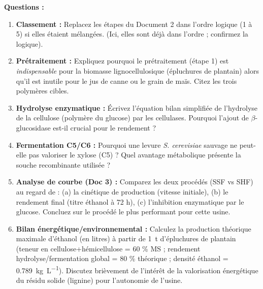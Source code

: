 \documentclass[11pt]{article}
\begin{document}
\begin{exercice}
\textbf{Questions :}
\begin{enumerate}
    \item \textbf{Classement :} Replacez les étapes du Document 2 dans l'ordre logique (1 à 5) si elles étaient mélangées. (Ici, elles sont déjà dans l'ordre ; confirmez la logique).
    \item \textbf{Prétraitement :} Expliquez pourquoi le prétraitement (étape 1) est \emph{indispensable} pour la biomasse lignocellulosique (épluchures de plantain) alors qu'il est inutile pour le jus de canne ou le grain de maïs. Citez les trois polymères cibles.
    \item \textbf{Hydrolyse enzymatique :} Écrivez l'équation bilan simplifiée de l'hydrolyse de la cellulose (polymère du glucose) par les cellulases. Pourquoi l'ajout de $\beta$-glucosidase est-il crucial pour le rendement ?
    \item \textbf{Fermentation C5/C6 :} Pourquoi une levure \emph{S. cerevisiae} sauvage ne peut-elle pas valoriser le xylose (C5) ? Quel avantage métabolique présente la souche recombinante utilisée ?
    \item \textbf{Analyse de courbe (Doc 3) :} Comparez les deux procédés (SSF vs SHF) au regard de : (a) la cinétique de production (vitesse initiale), (b) le rendement final (titre éthanol à 72 h), (c) l'inhibition enzymatique par le glucose. Concluez sur le procédé le plus performant pour cette usine.
    \item \textbf{Bilan énergétique/environnemental :} Calculez la production théorique maximale d'éthanol (en litres) à partir de \SI{1}{\tonne} d'épluchures de plantain (teneur en cellulose+hémicellulose = 60 \% MS ; rendement hydrolyse/fermentation global = 80 \% théorique ; densité éthanol = \SI{0,789}{\kilogram\per\liter}). Discutez brièvement de l'intérêt de la valorisation énergétique du résidu solide (lignine) pour l'autonomie de l'usine.
\end{enumerate}
\end{exercice}
\end{document}
